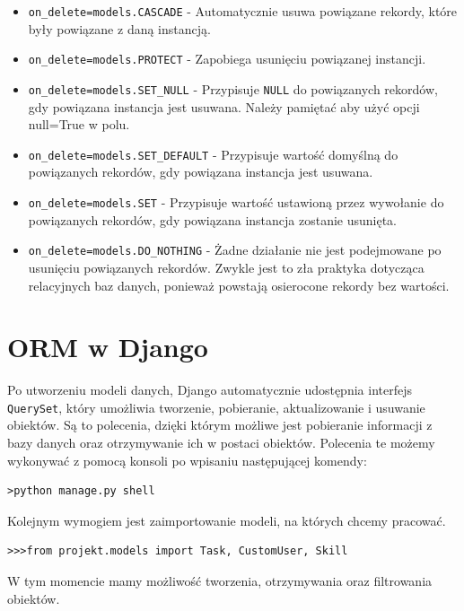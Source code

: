 \documentclass[oneside,polski,logo,indent]{amuthesis}
\begin{document}
\begin{itemize}
\item \texttt{on\_delete=models.CASCADE} - Automatycznie usuwa powiązane rekordy, które były powiązane z daną instancją.
\item \texttt{on\_delete=models.PROTECT} - Zapobiega usunięciu powiązanej instancji.
\item \texttt{on\_delete=models.SET\_NULL} - Przypisuje \texttt{NULL} do powiązanych rekordów, gdy powiązana instancja jest usuwana. Należy pamiętać aby użyć opcji null=True w polu.
\item \texttt{on\_delete=models.SET\_DEFAULT} - Przypisuje wartość domyślną do powiązanych rekordów, gdy powiązana instancja jest usuwana.
\item \texttt{on\_delete=models.SET} - Przypisuje wartość ustawioną przez wywołanie do powiązanych rekordów, gdy powiązana instancja zostanie usunięta.
\item \texttt{on\_delete=models.DO\_NOTHING} - Żadne działanie nie jest podejmowane po usunięciu powiązanych rekordów. Zwykle jest to zła praktyka dotycząca relacyjnych baz danych, ponieważ powstają osierocone rekordy bez wartości.
\end{itemize}
\section{ORM w Django}
Po utworzeniu modeli danych, Django automatycznie udostępnia interfejs \texttt{QuerySet}, który umożliwia tworzenie, pobieranie, aktualizowanie i usuwanie obiektów. Są to polecenia, dzięki którym możliwe jest pobieranie informacji z bazy danych oraz otrzymywanie ich w postaci obiektów. Polecenia te możemy wykonywać z pomocą konsoli po wpisaniu następującej komendy:
\begin{lstlisting}[style=DOS]
>python manage.py shell
\end{lstlisting}
Kolejnym wymogiem jest zaimportowanie modeli, na których chcemy pracować.
\begin{lstlisting}[style=DOS]
>>>from projekt.models import Task, CustomUser, Skill
\end{lstlisting}
W tym momencie mamy możliwość tworzenia, otrzymywania oraz filtrowania obiektów.
\end{document}
